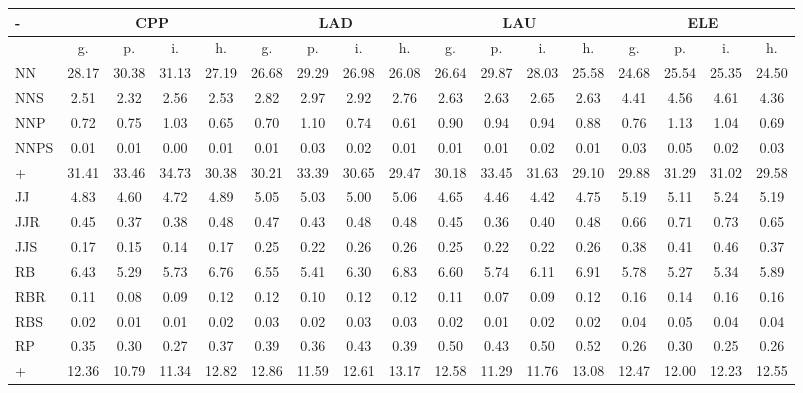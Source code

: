 \documentclass[%
 aip,
 jmp,%
 amsmath,amssymb,
 reprint,%
]{revtex4-1}
\begin{document}
\renewcommand{\arraystretch}{1.3}
\begin{table}
  \centering
    \small
\setlength{\tabcolsep}{.26667em}
  \begin{tabular}{|l|| c|c|c|c||  c|c|c|c||   c|c|c|c||   c|c|c|c|}\hline
-\-  & \multicolumn{4}{c|}{CPP} & \multicolumn{4}{c|}{LAD} & \multicolumn{4}{c|}{LAU} & \multicolumn{4}{c|}{ELE} \\ \hline
 & g. & p. & i. & h. &     g. & p. & i. & h. &    g. & p. & i. & h. &    g. & p. & i. & h. \\\hline
NN & 28.17 & 30.38 & 31.13 & 27.19 & 26.68 & 29.29 & 26.98 & 26.08 & 26.64 & 29.87 & 28.03 & 25.58 & 24.68 & 25.54 & 25.35 & 24.50\\
NNS & 2.51 & 2.32 & 2.56 & 2.53 & 2.82 & 2.97 & 2.92 & 2.76 & 2.63 & 2.63 & 2.65 & 2.63 & 4.41 & 4.56 & 4.61 & 4.36\\
NNP & 0.72 & 0.75 & 1.03 & 0.65 & 0.70 & 1.10 & 0.74 & 0.61 & 0.90 & 0.94 & 0.94 & 0.88 & 0.76 & 1.13 & 1.04 & 0.69\\
NNPS & 0.01 & 0.01 & 0.00 & 0.01 & 0.01 & 0.03 & 0.02 & 0.01 & 0.01 & 0.01 & 0.02 & 0.01 & 0.03 & 0.05 & 0.02 & 0.03\\\hline
+ & 31.41 & 33.46 & 34.73 & 30.38 & 30.21 & 33.39 & 30.65 & 29.47 & 30.18 & 33.45 & 31.63 & 29.10 & 29.88 & 31.29 & 31.02 & 29.58\\\hline\hline
JJ & 4.83 & 4.60 & 4.72 & 4.89 & 5.05 & 5.03 & 5.00 & 5.06 & 4.65 & 4.46 & 4.42 & 4.75 & 5.19 & 5.11 & 5.24 & 5.19\\
JJR & 0.45 & 0.37 & 0.38 & 0.48 & 0.47 & 0.43 & 0.48 & 0.48 & 0.45 & 0.36 & 0.40 & 0.48 & 0.66 & 0.71 & 0.73 & 0.65\\
JJS & 0.17 & 0.15 & 0.14 & 0.17 & 0.25 & 0.22 & 0.26 & 0.26 & 0.25 & 0.22 & 0.22 & 0.26 & 0.38 & 0.41 & 0.46 & 0.37\\
RB & 6.43 & 5.29 & 5.73 & 6.76 & 6.55 & 5.41 & 6.30 & 6.83 & 6.60 & 5.74 & 6.11 & 6.91 & 5.78 & 5.27 & 5.34 & 5.89\\
RBR & 0.11 & 0.08 & 0.09 & 0.12 & 0.12 & 0.10 & 0.12 & 0.12 & 0.11 & 0.07 & 0.09 & 0.12 & 0.16 & 0.14 & 0.16 & 0.16\\
RBS & 0.02 & 0.01 & 0.01 & 0.02 & 0.03 & 0.02 & 0.03 & 0.03 & 0.02 & 0.01 & 0.02 & 0.02 & 0.04 & 0.05 & 0.04 & 0.04\\
RP & 0.35 & 0.30 & 0.27 & 0.37 & 0.39 & 0.36 & 0.43 & 0.39 & 0.50 & 0.43 & 0.50 & 0.52 & 0.26 & 0.30 & 0.25 & 0.26\\\hline
+ & 12.36 & 10.79 & 11.34 & 12.82 & 12.86 & 11.59 & 12.61 & 13.17 & 12.58 & 11.29 & 11.76 & 13.08 & 12.47 & 12.00 & 12.23 & 12.55\\\hline\hline

\end{tabular}
\end{table}
\end{document}
